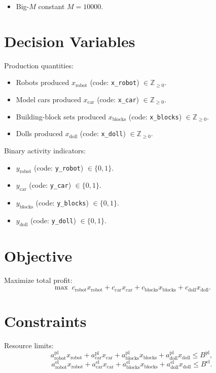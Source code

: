 \begin{itemize}
    \item Big-$M$ constant $M=10000$.
\end{itemize}

\section*{Decision Variables}

Production quantities:

\begin{itemize}
    \item Robots produced $x_{\text{robot}}$ (code: \texttt{x\_robot}) $\in \mathbb{Z}_{\ge 0}$.
    \item Model cars produced $x_{\text{car}}$ (code: \texttt{x\_car}) $\in \mathbb{Z}_{\ge 0}$.
    \item Building-block sets produced $x_{\text{blocks}}$ (code: \texttt{x\_blocks}) $\in \mathbb{Z}_{\ge 0}$.
    \item Dolls produced $x_{\text{doll}}$ (code: \texttt{x\_doll}) $\in \mathbb{Z}_{\ge 0}$.
\end{itemize}

Binary activity indicators:

\begin{itemize}
    \item $y_{\text{robot}}$ (code: \texttt{y\_robot}) $\in \{0,1\}$.
    \item $y_{\text{car}}$ (code: \texttt{y\_car}) $\in \{0,1\}$.
    \item $y_{\text{blocks}}$ (code: \texttt{y\_blocks}) $\in \{0,1\}$.
    \item $y_{\text{doll}}$ (code: \texttt{y\_doll}) $\in \{0,1\}$.
\end{itemize}

\section*{Objective}

Maximize total profit:
\[
\max \;
c_{\text{robot}}x_{\text{robot}}
+ c_{\text{car}}x_{\text{car}}
+ c_{\text{blocks}}x_{\text{blocks}}
+ c_{\text{doll}}x_{\text{doll}}.
\]

\section*{Constraints}

Resource limits:
\[
a^{\text{pl}}_{\text{robot}}x_{\text{robot}}
+a^{\text{pl}}_{\text{car}}x_{\text{car}}
+a^{\text{pl}}_{\text{blocks}}x_{\text{blocks}}
+a^{\text{pl}}_{\text{doll}}x_{\text{doll}}
\le B^{\text{pl}},
\]
\[
a^{\text{el}}_{\text{robot}}x_{\text{robot}}
+a^{\text{el}}_{\text{car}}x_{\text{car}}
+a^{\text{el}}_{\text{blocks}}x_{\text{blocks}}
+a^{\text{el}}_{\text{doll}}x_{\text{doll}}
\le B^{\text{el}}.
\]

